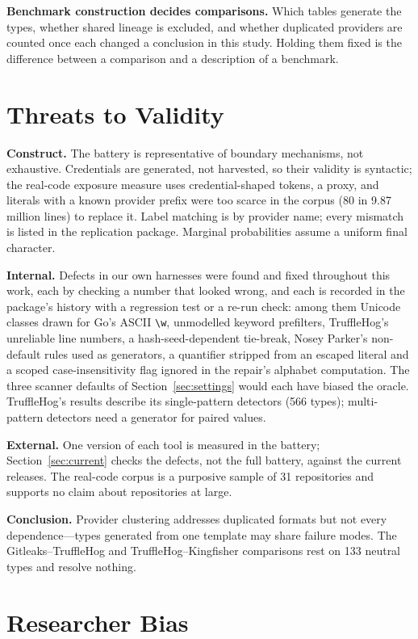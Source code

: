 \documentclass[10pt,journal,compsoc]{IEEEtran}
\begin{document}
\textbf{Benchmark construction decides comparisons.} Which tables generate the types, whether shared lineage is excluded, and whether duplicated providers are counted once each changed a conclusion in this study. Holding them fixed is the difference between a comparison and a description of a benchmark.

\section{Threats to Validity}
\label{sec:threats}

\textbf{Construct.} The battery is representative of boundary mechanisms, not exhaustive. Credentials are generated, not harvested, so their validity is syntactic; the real-code exposure measure uses credential-shaped tokens, a proxy, and literals with a known provider prefix were too scarce in the corpus (80 in 9.87 million lines) to replace it. Label matching is by provider name; every mismatch is listed in the replication package. Marginal probabilities assume a uniform final character.

\textbf{Internal.} Defects in our own harnesses were found and fixed throughout this work, each by checking a number that looked wrong, and each is recorded in the package's history with a regression test or a re-run check: among them Unicode classes drawn for Go's ASCII \verb|\w|, unmodelled keyword prefilters, TruffleHog's unreliable line numbers, a hash-seed-dependent tie-break, Nosey Parker's non-default rules used as generators, a quantifier stripped from an escaped literal and a scoped case-insensitivity flag ignored in the repair's alphabet computation. The three scanner defaults of Section~\ref{sec:settings} would each have biased the oracle. TruffleHog's results describe its single-pattern detectors (566 types); multi-pattern detectors need a generator for paired values.

\textbf{External.} One version of each tool is measured in the battery; Section~\ref{sec:current} checks the defects, not the full battery, against the current releases. The real-code corpus is a purposive sample of 31 repositories and supports no claim about repositories at large.

\textbf{Conclusion.} Provider clustering addresses duplicated formats but not every dependence---types generated from one template may share failure modes. The Gitleaks--TruffleHog and TruffleHog--Kingfisher comparisons rest on 133 neutral types and resolve nothing.

\section{Researcher Bias}
\label{sec:bias}
\end{document}
